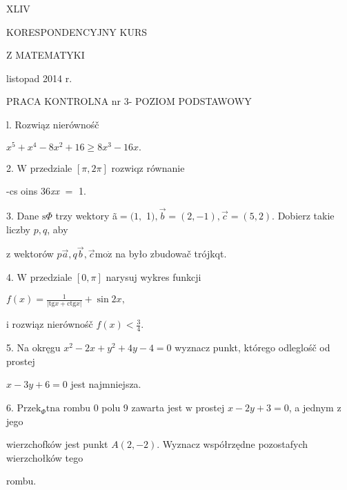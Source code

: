 \documentclass[a4paper,12pt]{article}
\begin{document}
XLIV

KORESPONDENCYJNY KURS

Z MATEMATYKI

listopad 2014 r.

PRACA KONTROLNA nr 3- POZIOM PODSTAWOWY

l. Rozwiąz nierównośč

$x^{5}+x^{4}-8x^{2}+16\geq 8x^{3}-16x.$

2. $\mathrm{W}$ przedziale $[\pi,2\pi]$ rozwiqz równanie

-cs  oins 36{\it xx} $=$ 1.

3. Dane $\mathrm{s}\Phi$ trzy wektory ã$= (1,$ 1$), \vec{b}= (2,-1), \vec{c}= (5,2)$. Dobierz takie liczby $p, q$, aby

$\mathrm{z}$ wektorów $p\vec{a}, q\vec{b}, \vec{c}\mathrm{m}\mathrm{o}\dot{\mathrm{z}}$ na było zbudowač trójkqt.

4. $\mathrm{W}$ przedziale $[0,\pi]$ narysuj wykres funkcji

$f(x)=\displaystyle \frac{1}{|\mathrm{t}\mathrm{g}x+\mathrm{c}\mathrm{t}\mathrm{g}x|}+\sin 2x,$

$\mathrm{i}$ rozwiąz nierównośč $f(x)<\displaystyle \frac{3}{4}.$

5. Na okręgu $x^{2}-2x+y^{2}+4y-4 = 0$ wyznacz punkt, którego odleglośč od prostej

$x-3y+6=0$ jest najmniejsza.

6. $\mathrm{P}\mathrm{r}\mathrm{z}\mathrm{e}\mathrm{k}_{\Phi}\mathrm{t}\mathrm{n}\mathrm{a}$ rombu $0$ polu 9 zawarta jest $\mathrm{w}$ prostej $x-2y+3 = 0$, a jednym $\mathrm{z}$ jego

wierzchofków jest punkt $A(2,-2)$. Wyznacz współrzędne pozostafych wierzchołków tego

rombu.
\end{document}
